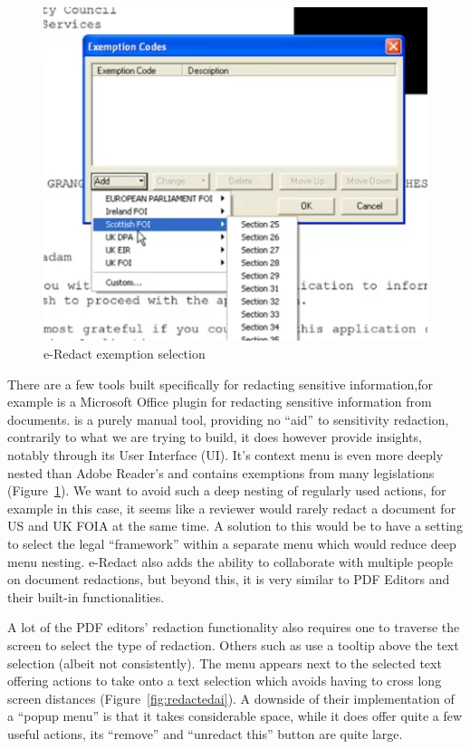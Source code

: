 \documentclass[\version]{l4proj}
\begin{document}
\begin{figure}
    \includegraphics[width=\linewidth]{images/related_products/eredact_dropdown.png}
    \caption{e-Redact exemption selection}\label{fig:eredact-dropdown}
    \vspace{-15pt}
\end{figure}

There are a few tools built specifically for redacting sensitive information,for example \textcite{ERedact} is a Microsoft Office plugin for redacting sensitive information from documents.
\textcite{ERedact} is a purely manual tool, providing no ``aid'' to sensitivity redaction, contrarily to what we are trying to build, it does however provide insights, notably through its User Interface (UI).
It's context menu is even more deeply nested than Adobe Reader's and contains exemptions from many legislations (Figure~\ref{fig:eredact-dropdown}).
We want to avoid such a deep nesting of regularly used actions, for example in this case, it seems like a reviewer would rarely redact a document for US and UK FOIA at the same time.
A solution to this would be to have a setting to select the legal ``framework'' within a separate menu which would reduce deep menu nesting.
e-Redact also adds the ability to collaborate with multiple people on document redactions, but beyond this, it is very similar to PDF Editors and their built-in functionalities.

A lot of the PDF editors' redaction functionality also requires one to traverse the screen to select the type of redaction.
Others such as \textcite{RedactedAIRemovea} use a tooltip above the text selection (albeit not consistently). The menu appears next to the selected text offering actions to take onto a text selection which avoids having to cross long screen distances (Figure~\ref{fig:redactedai}).
A downside of their implementation of a ``popup menu'' is that it takes considerable space, while it does offer quite a few useful actions, its ``remove'' and ``unredact this'' button are quite large.
\end{document}
